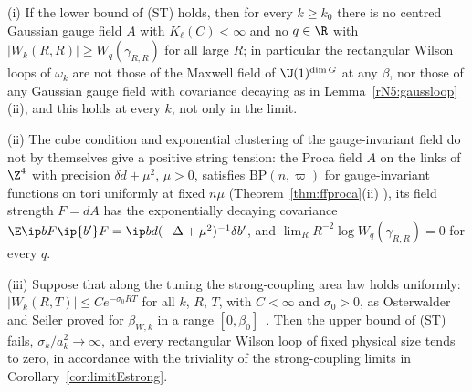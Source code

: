 \begin{theorem}\label{rN5:stgauss}
\textup{(i)} If the lower bound of \textup{(ST)} holds, then for every $k\ge
k_0$ there is no centred Gaussian gauge field $A$ with $K_\ell(C)<\infty$ and
no $q\in\R$ with $|W_k(R,R)|\ge W_q(\gamma_{R,R})$ for all large $R$; in
particular the rectangular Wilson loops of $\omega_k$ are not those of the
Maxwell field of $\U(1)^{\dim G}$ at any $\beta$, nor those of any Gaussian
gauge field with covariance decaying as in Lemma~\textup{\ref{rN5:gaussloop}(ii)},
and this holds at every $k$, not only in the limit.

\textup{(ii)} The cube condition and exponential clustering of the
gauge-invariant field do not by themselves give a positive string tension:
the Proca field $A$ on the links of $\Z^4$ with precision $\delta d+\mu^2$,
$\mu>0$, satisfies $\mathrm{BP}(n,\varpi)$ for gauge-invariant functions on
tori uniformly at fixed $n\mu$ \textup{(}Theorem~\textup{\ref{thm:ffproca}(ii)}
\textup{)}, its field strength $F=dA$ has the exponentially decaying covariance
$\E\ip bF\ip{b'}F=\ip b{d(-\Delta+\mu^2)^{-1}\delta b'}$, and
$\lim_RR^{-2}\log W_q(\gamma_{R,R})=0$ for every $q$.

\textup{(iii)} Suppose that along the tuning the strong-coupling area law
holds uniformly: $|W_k(R,T)|\le Ce^{-\sigma_0RT}$ for all $k$, $R$, $T$, with
$C<\infty$ and $\sigma_0>0$, as Osterwalder and Seiler proved for
$\beta_{W,k}$ in a range $[0,\beta_0]$~\cite{OSei78,Sei82}. Then the upper
bound of \textup{(ST)} fails, $\sigma_k/a_k^2\to\infty$, and every
rectangular Wilson loop of fixed physical size tends to zero, in accordance
with the triviality of the strong-coupling limits in
Corollary~\textup{\ref{cor:limitEstrong}}.
\end{theorem}

